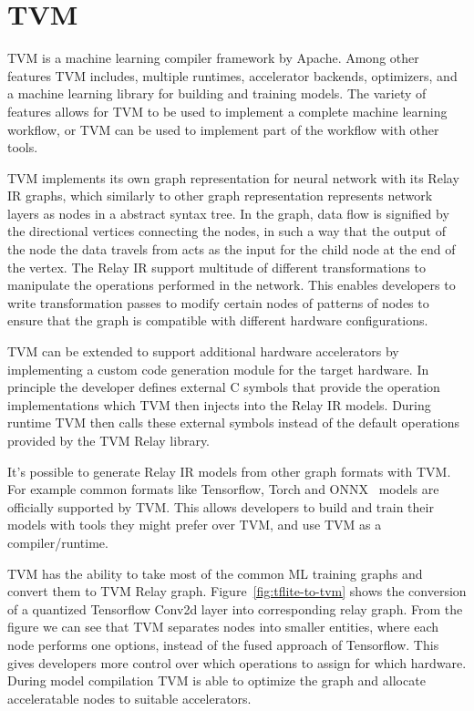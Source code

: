 \documentclass[12pt,a4paper,english
]{tunithesis}
\begin{document}
\section{TVM}
TVM is a machine learning compiler framework by Apache. Among other features TVM includes, multiple runtimes, accelerator backends, optimizers, and a machine learning library for building and training models. The variety of features allows for TVM to be used to implement a complete machine learning workflow, or TVM can be used to implement part of the workflow with other tools.

TVM implements its own graph representation for neural network with its Relay IR graphs, which similarly to other graph representation represents network layers as nodes in a abstract syntax tree.
In the graph, data flow is signified by the directional vertices connecting the nodes, in such a way that the output of the node the data travels from acts as the input for the child node at the end of the vertex. The Relay IR support multitude of different transformations to manipulate the operations performed in the network. This enables developers to write transformation passes to modify certain nodes of patterns of nodes to ensure that the graph is compatible with different hardware configurations.

TVM can be extended to support additional hardware accelerators by implementing a custom code generation module for the target hardware. In principle the developer defines external C symbols that provide the operation implementations which TVM then injects into the Relay IR models. During runtime TVM then calls these external symbols instead of the default operations provided by the TVM Relay library.

It's possible to generate Relay IR models from other graph formats with TVM. For example common formats like Tensorflow, Torch and ONNX~\cite{onnxruntime} models are officially supported by TVM. This allows developers to build and train their models with tools they might prefer over TVM, and use TVM as a compiler/runtime.

TVM has the ability to take most of the common ML training graphs and convert them to TVM Relay graph. Figure~\ref{fig:tflite-to-tvm} shows the conversion of a quantized Tensorflow Conv2d layer into corresponding relay graph. From the figure we can see that TVM separates nodes into smaller entities, where each node performs one options, instead of the fused approach of Tensorflow. This gives developers more control over which operations to assign for which hardware.
During model compilation TVM is able to optimize the graph and allocate acceleratable nodes to suitable accelerators.~\parencite{TVM}
\end{document}
